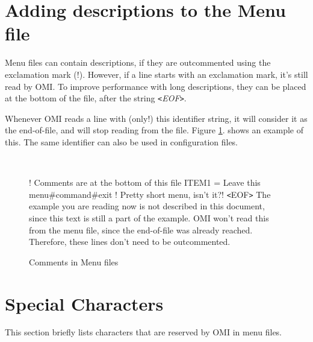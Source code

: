 \documentclass[a4paper]{book}
\newcommand{\vs}{\vspace{3mm}}
\newcommand{\lt}{\texttt{<}}
\newcommand{\gt}{\texttt{>}}
\renewcommand{\indent}{\hspace*{5mm}}
\begin{document}
\section{Adding descriptions to the Menu file}
\label{subsec:adding}

Menu files can contain descriptions, if they are outcommented using the 
exclamation mark (!). However, if a line starts with an exclamation mark, 
it's still read by OMI. To improve performance with long descriptions, they 
can be placed at the bottom of the file, after the string
\textsl{\lt EOF\gt}.

\vs

Whenever OMI reads a line with (only!) this identifier string, it will 
consider it as the end-of-file, and will stop reading from the file. Figure \ref{fig:comments}.
shows an example of this.
The same identifier can also be used in configuration files.

\begin{figure}[ht]
\begin{minipage}[t]{\textwidth}
\hrulefill \\
\begin{ttfamily}
\noindent! Comments are at the bottom of this file \newline
{} \newline
\indent ITEM1 = Leave this menu{\#}command{\#}exit \newline
\noindent! Pretty short menu, isn't it?! \newline
\noindent\lt EOF\gt \newline
\noindent The example you are reading now is not described in this document, 
since this text is still a part of the example. \newline
OMI won't read this from the menu file, since the end-of-file was 
already reached. Therefore, these lines don't need to be outcommented.
\end{ttfamily}
\caption{Comments in Menu files}\label{fig:comments}
\hrulefill
\end{minipage}
\end{figure}

\section{Special Characters}
\label{subsec:special}

This section briefly lists characters that are reserved by OMI in menu 
files.
\end{document}
